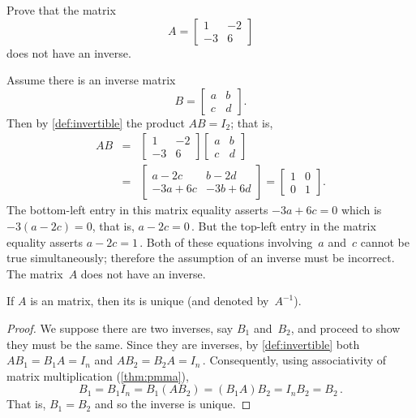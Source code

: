 \begin{example}[no inverse] \label{eg:no2x2inv}
Prove that the matrix
\begin{equation*}
A=\begin{bmatrix} 1&-2\\-3&6 \end{bmatrix}
\end{equation*}
does not have an inverse.
\begin{solution} 
Assume there is an inverse matrix
\begin{equation*}
B=\begin{bmatrix} a&b\\c&d \end{bmatrix}.
\end{equation*}
Then by \autoref{def:invertible} the product \(AB=I_2\); that is,
\begin{eqnarray*}
AB&=&\begin{bmatrix} 1&-2\\-3&6 \end{bmatrix}
\begin{bmatrix} a&b\\c&d \end{bmatrix}
\\&=&\begin{bmatrix} a-2c&b-2d\\-3a+6c&-3b+6d \end{bmatrix}
=\begin{bmatrix} 1&0\\0&1 \end{bmatrix}.
\end{eqnarray*}
The bottom-left entry in this matrix equality asserts \(-3a+6c=0\) which is \(-3(a-2c)=0\), that is, \(a-2c=0\)\,.
But the top-left entry in the matrix equality asserts \(a-2c=1\)\,.
Both of these equations involving~\(a\) and~\(c\) cannot be true simultaneously; therefore the assumption of an inverse must be incorrect.
The matrix~\(A\) does not have an inverse.
\end{solution}
\end{example}



\begin{theorem} \label{thm:uninv} 
If \(A\) is an  matrix, then its  is unique (and denoted by~\(A^{-1}\)).
\end{theorem}
\begin{proof} 
We suppose there are two inverses, say \(B_1\) and~\(B_2\), and proceed to show they must be the same.
Since they are inverses, by \autoref{def:invertible} both
\(AB_1=B_1A=I_n\) and \(AB_2=B_2A=I_n\)\,.
Consequently, using associativity of matrix multiplication (\autoref{thm:pmma}),
\begin{equation*}
B_1=B_1I_n=B_1(AB_2)=(B_1A)B_2=I_nB_2=B_2\,.
\end{equation*}
That is, \(B_1=B_2\) and so the inverse is unique.
\end{proof}



